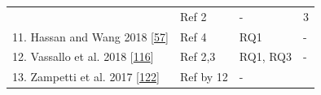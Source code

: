 \documentclass[]{book}
\begin{document}
\begin{longtable}[]{@{}llll@{}}
\begin{minipage}[t]{0.48\columnwidth}
\end{minipage} & \begin{minipage}[t]{0.20\columnwidth}\raggedright\strut
Ref 2\strut
\end{minipage} & \begin{minipage}[t]{0.14\columnwidth}\raggedright\strut
-\strut
\end{minipage} & \begin{minipage}[t]{0.06\columnwidth}\raggedright\strut
3\strut
\end{minipage}\tabularnewline
\begin{minipage}[t]{0.48\columnwidth}\raggedright\strut
11. Hassan and Wang 2018
{[}\protect\hyperlink{ref-hassan2018hirebuild}{57}{]}\strut
\end{minipage} & \begin{minipage}[t]{0.20\columnwidth}\raggedright\strut
Ref 4\strut
\end{minipage} & \begin{minipage}[t]{0.14\columnwidth}\raggedright\strut
RQ1\strut
\end{minipage} & \begin{minipage}[t]{0.06\columnwidth}\raggedright\strut
-\strut
\end{minipage}\tabularnewline
\begin{minipage}[t]{0.48\columnwidth}\raggedright\strut
12. Vassallo et al. 2018
{[}\protect\hyperlink{ref-vassallo2018break}{116}{]}\strut
\end{minipage} & \begin{minipage}[t]{0.20\columnwidth}\raggedright\strut
Ref 2,3\strut
\end{minipage} & \begin{minipage}[t]{0.14\columnwidth}\raggedright\strut
RQ1, RQ3\strut
\end{minipage} & \begin{minipage}[t]{0.06\columnwidth}\raggedright\strut
-\strut
\end{minipage}\tabularnewline
\begin{minipage}[t]{0.48\columnwidth}\raggedright\strut
13. Zampetti et al. 2017
{[}\protect\hyperlink{ref-zampetti2017open}{122}{]}\strut
\end{minipage} & \begin{minipage}[t]{0.20\columnwidth}\raggedright\strut
Ref by 12\strut
\end{minipage} & \begin{minipage}[t]{0.14\columnwidth}\raggedright\strut
-\strut
\end{minipage} & \begin{minipage}[t]{0.06\columnwidth}\raggedright\strut

\end{minipage}
\end{longtable}
\end{document}
